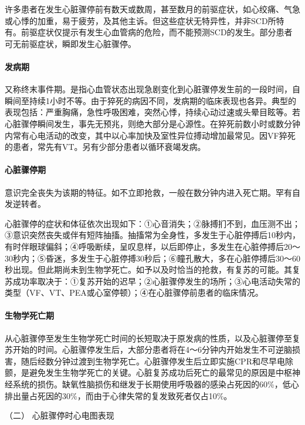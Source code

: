 许多患者在发生心脏骤停前有数天或数周，甚至数月的前驱症状，如心绞痛、气急或心悸的加重，易于疲劳，及其他主诉。但这些症状无特异性，并非SCD所特有。前驱症状仅提示有发生心血管病的危险，而不能预测SCD的发生。部分患者可无前驱症状，瞬即发生心脏骤停。

\paragraph{发病期}

又称终末事件期。是指心血管状态出现急剧变化到心脏骤停发生前的一段时间，自瞬间至持续1小时不等。由于猝死的病因不同，发病期的临床表现也各异。典型的表现包括：严重胸痛，急性呼吸困难，突然心悸，持续心动过速或头晕目眩等。若心脏骤停瞬间发生，事先无预兆，则绝大部分是心源性。在猝死前数小时或数分钟内常有心电活动的改变，其中以心率加快及室性异位搏动增加最常见。因VF猝死的患者，常先有VT。另有少部分患者以循环衰竭发病。

\paragraph{心脏骤停期}

意识完全丧失为该期的特征。如不立即抢救，一般在数分钟内进入死亡期。罕有自发逆转者。

心脏骤停的症状和体征依次出现如下：①心音消失；②脉搏扪不到，血压测不出；③意识突然丧失或伴有短阵抽搐。抽搐常为全身性，多发生于心脏停搏后10秒内，有时伴眼球偏斜；④呼吸断续，呈叹息样，以后即停止，多发生在心脏停搏后20～30秒内；⑤昏迷，多发生于心脏停搏30秒后；⑥瞳孔散大，多在心脏停搏后30～60秒出现。但此期尚未到生物学死亡。如予以及时恰当的抢救，有复苏的可能。其复苏成功率取决于：①复苏开始的迟早；②心脏骤停发生的场所；③心电活动失常的类型（VF、VT、PEA或心室停顿）；④在心脏骤停前患者的临床情况。

\paragraph{生物学死亡期}

从心脏骤停至发生生物学死亡时间的长短取决于原发病的性质，以及心脏骤停至复苏开始的时间。心脏骤停发生后，大部分患者将在4～6分钟内开始发生不可逆脑损害，随后经数分钟过渡到生物学死亡。心脏骤停发生后立即实施CPR和尽早电除颤，是避免发生生物学死亡的关键。心脏复苏成功后死亡的最常见的原因是中枢神经系统的损伤。缺氧性脑损伤和继发于长期使用呼吸器的感染占死因的60\%，低心排出量占死因的30\%，而由于心律失常的复发致死者仅占10\%。

\hypertarget{text00281.htmlux5cux23CHP10-1-2-2-2}{}
（二） 心脏骤停时心电图表现


